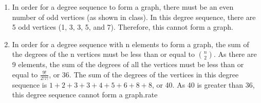 \documentclass{article}
\theoremstyle{definition}
\begin{document}
\begin{enumerate}[label = \alph*)]
    \item In order for a degree sequence to form a graph, there must be an even number of odd vertices (as shown in class). In this degree sequence, there are 5 odd vertices (1, 3, 3, 5, and 7). Therefore, this cannot form a graph.
    
    \item In order for a degree sequence with n elements to form a graph, the sum of the degrees of the n vertices must be less than or equal to $\binom{n}{2}$. As there are 9 elements, the sum of the degrees of all the vertices must be less than or equal to $\frac{9!}{2!7!}$, or 36. The sum of the degrees of the vertices in this degree sequence is $1+2+3+3+4+5+6+8+8$, or 40. As 40 is greater than 36, this degree sequence cannot form a graph.rate
\end{enumerate}
\end{document}
